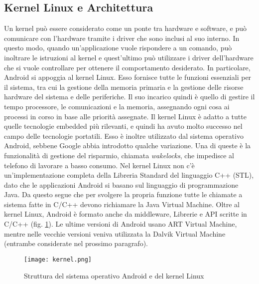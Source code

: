 \subsection{Kernel Linux e Architettura}
Un kernel può essere considerato come un ponte tra hardware e software, e può comunicare con
l’hardware tramite i driver che sono inclusi al suo interno. In questo modo, quando
un’applicazione vuole rispondere a un comando, può inoltrare le istruzioni al
kernel e quest’ultimo può utilizzare i driver dell’hardware che si vuole
controllare per ottenere il comportamento desiderato. In particolare, Android si
appoggia al kernel Linux. Esso fornisce
tutte le funzioni essenziali per il sistema, tra cui la gestione della memoria
primaria e la gestione delle risorse hardware del sistema e delle periferiche.
Il suo incarico quindi è quello di gestire
il tempo processore, le comunicazioni e la memoria, assegnando ogni cosa ai processi in
corso in base alle priorità assegnate. Il kernel Linux è adatto a tutte quelle
tecnologie embedded più rilevanti, e quindi ha avuto molto successo nel campo
delle tecnologie portatili.
Esso è inoltre utilizzato dal sistema operativo Android, sebbene Google abbia
introdotto qualche variazione. Una di queste è la funzionalità di gestione
del risparmio, chiamata \textit{wakelocks}, che impedisce al telefono di lavorare a
basso consumo. Nel kernel Linux non c’è un’implementazione completa della
Libreria Standard del linguaggio C++ (STL), dato che le applicazioni Android si
basano sul linguaggio di programmazione Java. Da questo segue che per svolgere
la propria funzione tutte le chiamate a
sistema fatte in C/C++ devono richiamare la Java Virtual Machine. Oltre al
kernel Linux, Android è formato anche da  middleware, Librerie e API scritte in
C/C++ (fig. \ref{kernel}). Le
ultime versioni di Android usano ART Virtual Machine, mentre nelle vecchie versioni
veniva utilizzata la Dalvik Virtual Machine (entrambe considerate nel prossimo
paragrafo).
\begin{figure}
    \centering
    \texttt{[image: kernel.png]}
    \caption{Struttura del sistema operativo Android e del kernel Linux}
    \label{kernel}
\end{figure}

